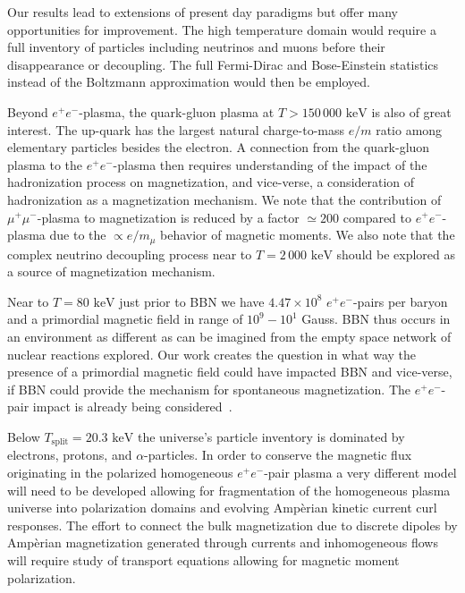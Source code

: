 \documentclass[aps,prd,floatfix,reprint]{revtex4-2}
\newcommand*{\keV}{\text{ keV}}
\begin{document}
Our results lead to extensions of present day paradigms but offer many opportunities for improvement. The high temperature domain would require a full inventory of particles including neutrinos and muons before their disappearance or decoupling. The full Fermi-Dirac and Bose-Einstein statistics instead of the Boltzmann approximation would then be employed. 

Beyond $e^{+}e^{-}$-plasma, the quark-gluon plasma at $T>150\,000\keV$ is also of great interest. The up-quark has the largest natural charge-to-mass $e/m$ ratio among elementary particles besides the electron. A connection from the quark-gluon plasma to the $e^{+}e^{-}$-plasma then requires understanding of the impact of the hadronization process on magnetization, and vice-verse, a consideration of hadronization as a magnetization mechanism. We note that the contribution of $\mu^{+}\mu^{-}$-plasma to magnetization is reduced by a factor $\simeq 200$ compared to $e^{+}e^{-}$-plasma due to the $\propto e/m_{\mu}$ behavior of magnetic moments. We also note that the complex neutrino decoupling process near to $T=2\,000\keV$ should be explored as a source of magnetization mechanism.
 
Near to $T=80\keV$ just prior to BBN we have $4.47\times10^{8}$ $e^{+}e^{-}$-pairs per baryon and a primordial magnetic field in range of $10^{9}-10^{1}$ Gauss. BBN thus occurs in an environment as different as can be imagined from the empty space network of nuclear reactions explored. Our work creates the question in what way the presence of a primordial magnetic field could have impacted BBN and vice-verse, if BBN could provide the mechanism for spontaneous magnetization. The $e^{+}e^{-}$-pair impact is already being considered~\cite{Grayson:2023flr}.

Below $T_\mathrm{split}=20.3\keV$ the universe's particle inventory is dominated by electrons, protons, and $\alpha$-particles. In order to conserve the magnetic flux originating in the polarized homogeneous $e^{+}e^{-}$-pair plasma a very different model will need to be developed allowing for fragmentation of the homogeneous plasma universe into polarization domains and evolving Amp{\`e}rian kinetic current curl responses. The effort to connect the bulk magnetization due to discrete dipoles by Amp{\`e}rian magnetization generated through currents and inhomogeneous flows will require study of transport equations allowing for magnetic moment polarization. 
\end{document}
